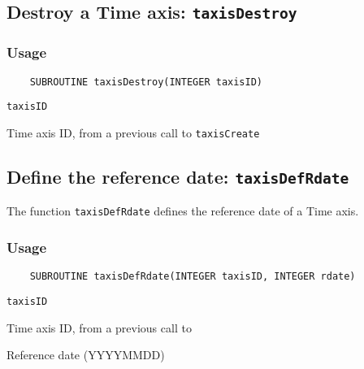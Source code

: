 \subsection{Destroy a Time axis: {\tt taxisDestroy}}
\label{taxisDestroy}
\subsubsection*{Usage}

\begin{verbatim}
    SUBROUTINE taxisDestroy(INTEGER taxisID)
\end{verbatim}

\hspace*{4mm}\begin{minipage}[]{15cm}
\begin{deflist}{\tt taxisID\ }
\item[{\tt taxisID}]
Time axis ID, from a previous call to {\tt taxisCreate}

\end{deflist}
\end{minipage}


\subsection{Define the reference date: {\tt taxisDefRdate}}
\label{taxisDefRdate}

The function {\tt taxisDefRdate} defines the reference date of a Time axis.

\subsubsection*{Usage}

\begin{verbatim}
    SUBROUTINE taxisDefRdate(INTEGER taxisID, INTEGER rdate)
\end{verbatim}

\hspace*{4mm}\begin{minipage}[]{15cm}
\begin{deflist}{\tt taxisID\ }
\item[{\tt taxisID}]
Time axis ID, from a previous call to {}
\item[{\tt rdate}]
Reference date (YYYYMMDD)

\end{deflist}
\end{minipage}


